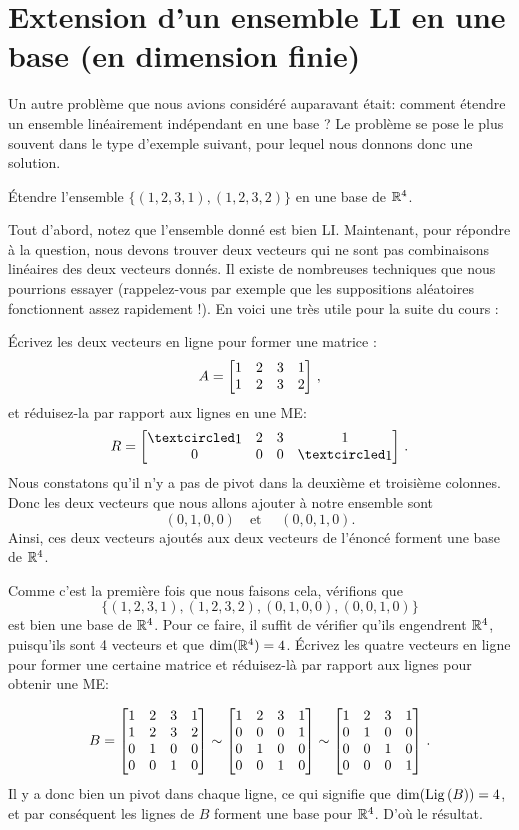 \section{Extension d'un ensemble LI en une base (en dimension finie)}

Un autre problème que nous avions considéré auparavant \'etait: comment \'etendre un ensemble linéairement indépendant en 
une base ?  Le problème se pose le plus souvent dans le type d'exemple suivant, pour lequel nous donnons donc une solution.

\begin{myprob} \'Etendre l'ensemble $\{ (1,2,3,1), (1,2,3,2)\}$ en une base de $\mathbb{R}^4$.

\begin{mysol} Tout d'abord, notez que l'ensemble donné est bien LI. Maintenant, pour répondre à la question, nous devons trouver deux vecteurs qui ne sont pas combinaisons linéaires des deux vecteurs donnés. 
Il existe de nombreuses techniques que nous pourrions essayer (rappelez-vous par exemple que les suppositions aléatoires
fonctionnent assez rapidement !). En voici une très utile pour la suite du cours :

Écrivez les deux vecteurs en ligne pour former une matrice :
$$
A = \left[ \begin{matrix}  1&2&3&1\\ 1&2&3&2 \end{matrix} \right]\,,
$$
et réduisez-la par rapport aux lignes en une ME:
$$
R = \mat{ \pivot & 2&3 & 1\\ 0 & 0 & 0 & \pivot}\,.
$$
Nous constatons qu'il n'y a pas de pivot dans 
la deuxième et troisième colonnes.  Donc les deux vecteurs
que nous allons ajouter à notre ensemble sont
$$
(0,1,0,0) \quad \textrm{et } \quad (0,0,1,0).
$$
Ainsi, ces deux vecteurs ajoutés aux deux vecteurs de l'énoncé forment une base de $\mathbb{R}^4$.

Comme c'est la première fois que nous faisons cela, v\'erifions que 
$$\{ (1,2,3,1), (1,2,3,2), (0,1,0,0), (0,0,1,0)\}$$ 
est bien une base de $\mathbb{R}^4$. Pour ce faire, il suffit de vérifier qu'ils engendrent $\mathbb{R}^4$, puisqu'ils sont 4 vecteurs et que $\dim(\mathbb{R}^4)=4$. Écrivez les quatre vecteurs en ligne pour former une certaine matrice et réduisez-là par rapport aux lignes pour obtenir une ME:

$$
B = \left[ \begin{matrix} 
 1 & 2&3 & 1\\
 1 & 2 & 3 &2\\
 0 & 1 & 0 & 0\\
 0 & 0 & 1 & 0 \end{matrix} \right]
\sim
\left[ \begin{matrix}  1 & 2&3 & 1\\
 0 & 0 & 0 &1\\
 0 & 1 & 0 & 0\\
 0 & 0 & 1 & 0 \end{matrix} \right]
\sim
\left[ \begin{matrix}  1 & 2&3 & 1\\
0 & 1 & 0 & 0\\
 0 & 0 & 1 & 0\\
 0 & 0 & 0 &1 \end{matrix} \right]\,.
$$
Il y a donc bien un pivot dans chaque ligne, ce qui signifie que $\dim(\operatorname{Lig\,}(B)) = 4$, et par conséquent les lignes de $B$ forment une base pour $\mathbb{R}^4$. D'où le résultat.


\end{mysol}\end{myprob}

